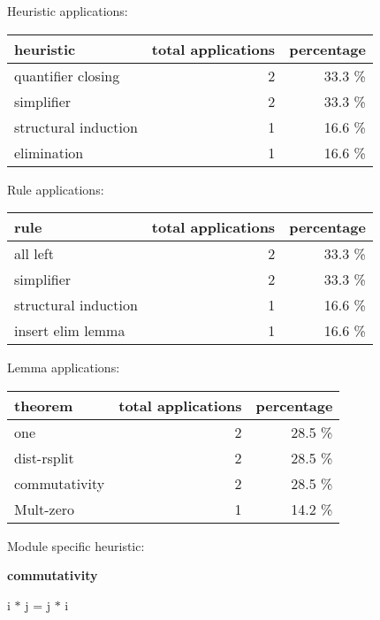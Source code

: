 \documentclass[a4paper]{article}
\begin{document}
\medskip


Heuristic applications:

\begin{supertabular}{l|r|r}
heuristic	& total applications & percentage \\ \hline
quantifier closing & 2 & 33.3 \% \\
simplifier & 2 & 33.3 \% \\
structural induction & 1 & 16.6 \% \\
elimination & 1 & 16.6 \% \\

\end{supertabular}

Rule applications:

\begin{supertabular}{l|r|r}
rule	        & total applications & percentage \\ \hline
all left & 2 & 33.3 \% \\
simplifier & 2 & 33.3 \% \\
structural induction & 1 & 16.6 \% \\
insert elim lemma & 1 & 16.6 \% \\

\end{supertabular}

Lemma applications:

\begin{supertabular}{l|r|r}
theorem	        & total applications & percentage \\ \hline
one & 2 & 28.5 \% \\
dist-rsplit & 2 & 28.5 \% \\
commutativity & 2 & 28.5 \% \\
Mult-zero & 1 & 14.2 \% \\

\end{supertabular}

Module specific heuristic:

\pagebreak

{\LARGE\bf commutativity}\label{lemma-commutativity}

\medskip

 \Fol i $*$ j = j $*$ i
\end{document}
